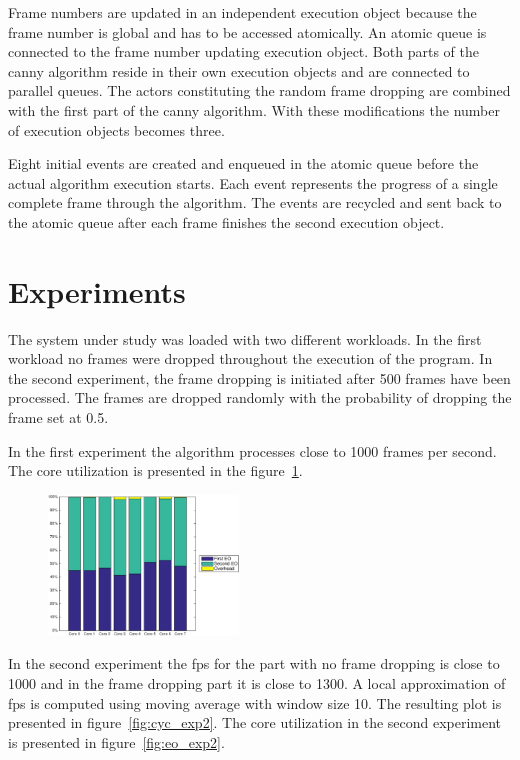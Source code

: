 \documentclass[a4paper,10pt]{article}
\begin{document}
Frame numbers are updated in an independent execution object because the frame number is global and has to be accessed atomically. An atomic queue is connected to the frame number updating execution object. Both parts of the canny algorithm reside in their own execution objects and are connected to parallel queues. The actors constituting the random frame dropping are combined with the first part of the canny algorithm. With these modifications the number of execution objects becomes three.

Eight initial events are created and enqueued in the atomic queue before the actual algorithm execution starts. Each event represents the progress of a single complete frame through the algorithm. The events are recycled and sent back to the atomic queue after each frame finishes the second execution object.

\section{Experiments}
The system under study was loaded with two different workloads. In the first workload no frames were dropped throughout the execution of the program. In the second experiment, the frame dropping is initiated after 500 frames have been processed. The frames are dropped randomly with the probability of dropping the frame set at 0.5.

In the first experiment the algorithm processes close to 1000 frames per second. The core utilization is presented in the figure~\ref{fig:eo_exp1}.
\begin{figure}
    \centering
        \includegraphics[width=0.45\textwidth]{exp1_eo.eps}
        \label{fig:eo_exp1}
\end{figure}

In the second experiment the fps for the part with no frame dropping is close to 1000 and in the frame dropping part it is close to 1300. A local approximation of fps is computed using moving average with window size 10. The resulting plot is presented in figure~\ref{fig:cyc_exp2}. The core utilization in the second experiment is presented in figure~\ref{fig:eo_exp2}.
\end{document}
